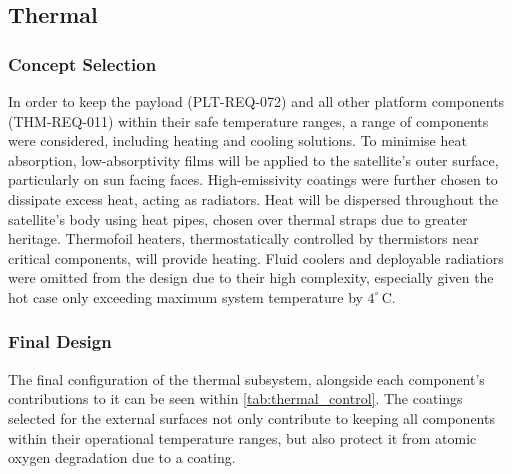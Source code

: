 \documentclass[a4paper, 11pt, conference]{IEEEtran}
\begin{document}
\begingroup
\raggedbottom
\setlength{\parskip}{4pt}
\edef\restoreFlowTopNumber{\arabic{topnumber}}
\edef\restoreFlowBottomNumber{\arabic{bottomnumber}}
\edef\restoreFlowTotalNumber{\arabic{totalnumber}}
\renewcommand{\topfraction}{0.9}
\renewcommand{\bottomfraction}{0.8}
\renewcommand{\textfraction}{0.1}
\renewcommand{\floatpagefraction}{0.75}
\setcounter{topnumber}{3}
\setcounter{bottomnumber}{2}
\setcounter{totalnumber}{5}
\subsection{Thermal}
\subsubsection{Concept Selection}
In order to keep the payload (PLT-REQ-072) and all other platform components (THM-REQ-011) within their safe temperature ranges, a range of components were considered, including heating and cooling solutions. To minimise heat absorption, low-absorptivity films will be applied to the satellite’s outer surface, particularly on sun facing faces. High-emissivity coatings were further chosen to dissipate excess heat, acting as radiators. Heat will be dispersed throughout the satellite’s body using heat pipes, chosen over thermal straps due to greater heritage. Thermofoil heaters, thermostatically controlled by thermistors near critical components, will provide heating. Fluid coolers and deployable radiatiors were omitted from the design due to their high complexity, especially given the hot case only exceeding maximum system temperature by $4^\circ\,\mathrm{C}$.
\subsubsection{Final Design}
The final configuration of the thermal subsystem, alongside each component’s contributions to it can be seen within \autoref{tab:thermal_control}. The coatings selected for the external surfaces not only contribute to keeping all components within their operational temperature ranges, but also protect it from atomic oxygen degradation due to a  coating. 
\end{document}
